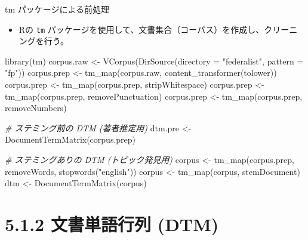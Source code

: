 \documentclass[
  ignorenonframetext,
]{beamer}
\newenvironment{Shaded}{\begin{snugshade}}{\end{snugshade}}
\newcommand{\AttributeTok}[1]{\textcolor[rgb]{0.77,0.63,0.00}{#1}}
\newcommand{\CommentTok}[1]{\textcolor[rgb]{0.56,0.35,0.01}{\textit{#1}}}
\newcommand{\FunctionTok}[1]{\textcolor[rgb]{0.00,0.00,0.00}{#1}}
\newcommand{\NormalTok}[1]{#1}
\newcommand{\OtherTok}[1]{\textcolor[rgb]{0.56,0.35,0.01}{#1}}
\newcommand{\StringTok}[1]{\textcolor[rgb]{0.31,0.60,0.02}{#1}}
\providecommand{\tightlist}{%
  \setlength{\itemsep}{0pt}\setlength{\parskip}{0pt}}
\begin{document}
\begin{frame}[fragile]{tm パッケージによる前処理}
\protect\hypertarget{tm-ux30d1ux30c3ux30b1ux30fcux30b8ux306bux3088ux308bux524dux51e6ux7406}{}
\begin{itemize}
\tightlist
\item
  Rの \texttt{tm}
  パッケージを使用して、文書集合（コーパス）を作成し、クリーニングを行う。
\end{itemize}

\scriptsize

\begin{Shaded}
\begin{Highlighting}[]
\FunctionTok{library}\NormalTok{(tm)}
\NormalTok{corpus.raw }\OtherTok{\textless{}{-}} \FunctionTok{VCorpus}\NormalTok{(}\FunctionTok{DirSource}\NormalTok{(}\AttributeTok{directory =} \StringTok{"federalist"}\NormalTok{, }\AttributeTok{pattern =} \StringTok{"fp"}\NormalTok{))}
\NormalTok{corpus.prep }\OtherTok{\textless{}{-}} \FunctionTok{tm\_map}\NormalTok{(corpus.raw, }\FunctionTok{content\_transformer}\NormalTok{(tolower))}
\NormalTok{corpus.prep }\OtherTok{\textless{}{-}} \FunctionTok{tm\_map}\NormalTok{(corpus.prep, stripWhitespace)}
\NormalTok{corpus.prep }\OtherTok{\textless{}{-}} \FunctionTok{tm\_map}\NormalTok{(corpus.prep, removePunctuation)}
\NormalTok{corpus.prep }\OtherTok{\textless{}{-}} \FunctionTok{tm\_map}\NormalTok{(corpus.prep, removeNumbers)}

\CommentTok{\# ステミング前の DTM (著者推定用)}
\NormalTok{dtm.pre }\OtherTok{\textless{}{-}} \FunctionTok{DocumentTermMatrix}\NormalTok{(corpus.prep)}

\CommentTok{\# ステミングありの DTM (トピック発見用)}
\NormalTok{corpus }\OtherTok{\textless{}{-}} \FunctionTok{tm\_map}\NormalTok{(corpus.prep, removeWords, }\FunctionTok{stopwords}\NormalTok{(}\StringTok{"english"}\NormalTok{))}
\NormalTok{corpus }\OtherTok{\textless{}{-}} \FunctionTok{tm\_map}\NormalTok{(corpus, stemDocument)}
\NormalTok{dtm }\OtherTok{\textless{}{-}} \FunctionTok{DocumentTermMatrix}\NormalTok{(corpus)}
\end{Highlighting}
\end{Shaded}

\normalsize
\end{frame}

\hypertarget{ux6587ux66f8ux5358ux8a9eux884cux5217-dtm}{%
\section{5.1.2 文書単語行列
(DTM)}\label{ux6587ux66f8ux5358ux8a9eux884cux5217-dtm}}
\end{document}

